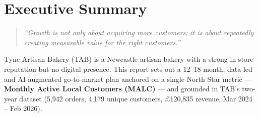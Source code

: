 \documentclass[
  11pt,
]{article}
\begin{document}
\tableofcontents

\newpage

\section{Executive Summary}\label{executive-summary}

\begin{quote}
\emph{``Growth is not only about acquiring more customers; it is about
repeatedly creating measurable value for the right customers.''}
\end{quote}

Tyne Artisan Bakery (TAB) is a Newcastle artisan bakery with a strong
in-store reputation but no digital presence. This report sets out a
12--18 month, data-led and AI-augmented go-to-market plan anchored on a
single North Star metric --- \textbf{Monthly Active Local Customers
(MALC)} --- and grounded in TAB's two-year dataset (5,942 orders, 4,179
unique customers, £120,835 revenue, Mar 2024 -- Feb 2026).
\end{document}
